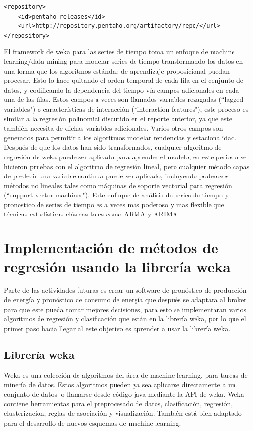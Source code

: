 \begin{lstlisting}[frame=single] 
<repository>
	<id>pentaho-releases</id>
	<url>http://repository.pentaho.org/artifactory/repo/</url>
</repository>
\end{lstlisting}
El framework de weka para las series de tiempo toma un enfoque de machine learning/data mining para modelar series de tiempo transformando los datos en una forma que los algoritmos estándar de aprendizaje proposicional puedan procesar. Esto lo hace quitando el orden temporal de cada fila en el conjunto de datos, y codificando la dependencia del tiempo vía campos adicionales en cada una de las filas. 
Estos campos a veces son llamados variables rezagadas (``lagged variables") o características de interacción (``interaction features"), este proceso es similar a la regresión polinomial discutido en el reporte anterior, ya que este también necesita de dichas variables adicionales. 
Varios otros campos son generados para permitir a los algoritmos modelar tendencias y estacionalidad. 
Después de que los datos han sido transformados, cualquier algoritmo de regresión de weka puede ser aplicado para aprender el modelo, en este periodo se hicieron pruebas con el algoritmo de regresión lineal, pero cualquier método capas de predecir una variable continua puede ser aplicado, incluyendo poderosos métodos no lineales tales como  máquinas de soporte vectorial para regresión (``support vector machines"). Este enfoque de análisis de series de tiempo y pronostico de series de tiempo es a veces mas poderoso y mas flexible que técnicas estadísticas clásicas  tales como ARMA y ARIMA \cite{pentaho}.

\section{Implementación de métodos de regresión usando la librería weka}

Parte de las actividades futuras es crear un software de pronóstico de producción de energía y pronóstico de consumo de energía que después se adaptara al broker para que este pueda tomar mejores decisiones, para esto se implementaran varios algoritmos de regresión y clasificación que están en la librería weka, por lo que el primer paso hacia llegar al este objetivo es aprender a usar la librería weka.

\subsection{Librería weka}
Weka es una colección de algoritmos del área de machine learning, para tareas de minería de datos. Estos algoritmos pueden ya sea aplicarse directamente a un conjunto de datos, o llamarse desde código java mediante la API de weka.
Weka contiene herramientas para el preprocesado de datos, clasificación, regresión, clusterización, reglas de asociación y visualización. También está bien adaptado para el desarrollo de nuevos esquemas de machine learning. 

